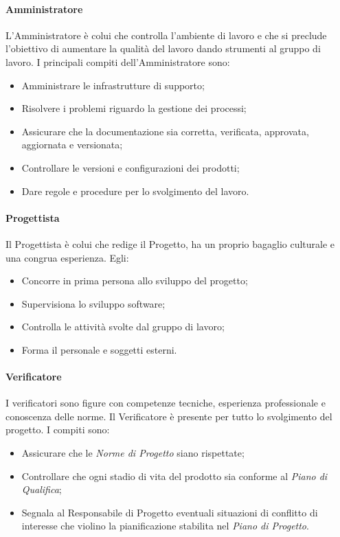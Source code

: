                 \paragraph{Amministratore}
                    L'Amministratore è colui che controlla l'ambiente di lavoro e che si preclude l'obiettivo di aumentare la qualità del lavoro dando strumenti al gruppo di lavoro.
                    I principali compiti dell'Amministratore sono:
                    \begin{itemize}
                        \item Amministrare le infrastrutture di supporto;
                        \item Risolvere i problemi riguardo la gestione dei processi;
                        \item Assicurare che la documentazione sia corretta, verificata, approvata, aggiornata e versionata;
                        \item Controllare le versioni e configurazioni dei prodotti;
                        \item Dare regole e procedure per lo svolgimento del lavoro.
                    \end{itemize}
                \paragraph{Progettista}
                    Il Progettista è colui che redige il Progetto, ha un proprio bagaglio culturale e una congrua esperienza. Egli:
                    \begin{itemize}
                        \item Concorre in prima persona allo sviluppo del progetto;
                        \item Supervisiona lo sviluppo software;
                        \item Controlla le attività svolte dal gruppo di lavoro;
                        \item Forma il personale e soggetti esterni.
                    \end{itemize}
                \paragraph{Verificatore}
                    I verificatori sono figure con competenze tecniche, esperienza professionale e conoscenza delle norme. Il Verificatore è presente per tutto lo svolgimento del progetto. I compiti sono:
                    \begin{itemize}
                        \item Assicurare che le \textit{Norme di Progetto} siano rispettate;
                        \item Controllare che ogni stadio di vita del prodotto sia conforme al \textit{Piano di Qualifica};
                        \item Segnala al Responsabile di Progetto eventuali situazioni di conflitto di interesse che violino la pianificazione stabilita nel \textit{Piano di Progetto}.
                    \end{itemize}
